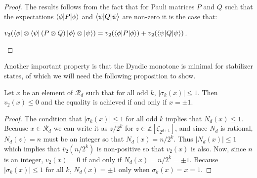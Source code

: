 \documentclass[12pt]{dalthesis}
\begin{document}
\begin{proof}
The results follows from the fact that for Pauli matrices $P$ and $Q$ such that the expectations $\braket{\phi | P |\phi}$ and $\braket{\psi | Q | \psi}$ are non-zero it is the case that:
\begin{center}
$v_2 (\bra{\phi} \otimes \bra{\psi} (P \otimes Q) \ket{\phi} \otimes \ket{\psi}) = v_2 (\braket{\phi | P | \phi}) + v_2(\braket{\psi | Q | \psi})$.
\end{center}
\end{proof}

Another important property is that the Dyadic monotone is minimal for stabilizer states, of which we will need the following proposition to show.

\begin{proposition}
\label{sigmak}
Let $x$ be an element of $\mathcal{R}_d$ such that for all odd $k$, $|\sigma_k (x)| \leq 1$. Then $v_2(x) \leq 0$ and the equality is achieved if and only if $x = \pm 1$.
\end{proposition}
\begin{proof}
The condition that $|\sigma_k (x)| \leq 1$ for all odd $k$ implies that $N_d(x) \leq 1$. Because $x \in \mathcal{R}_d$ we can write it as $z/2^k$ for $z \in \mathbb{Z}[\zeta_{2^{d+1}}]$, and since $N_d$ is rational, $N_d(z) = n$ must be an integer so that $N_d(x) = n/2^k$. Thus $|N_d(x)| \leq 1$ which implies that $\bar{v}_2 (n/2^k)$ is non-positive so that $v_2(x)$ is also. Now, since $n$ is an integer, $v_2(x) = 0$ if and only if $N_d(x) = n/2^k = \pm 1$. Because $|\sigma_k (x)| \leq 1$ for all $k$, $N_d(x) = \pm 1$ only when $\sigma_k (x) = x = 1$.
\end{proof}
\end{document}
